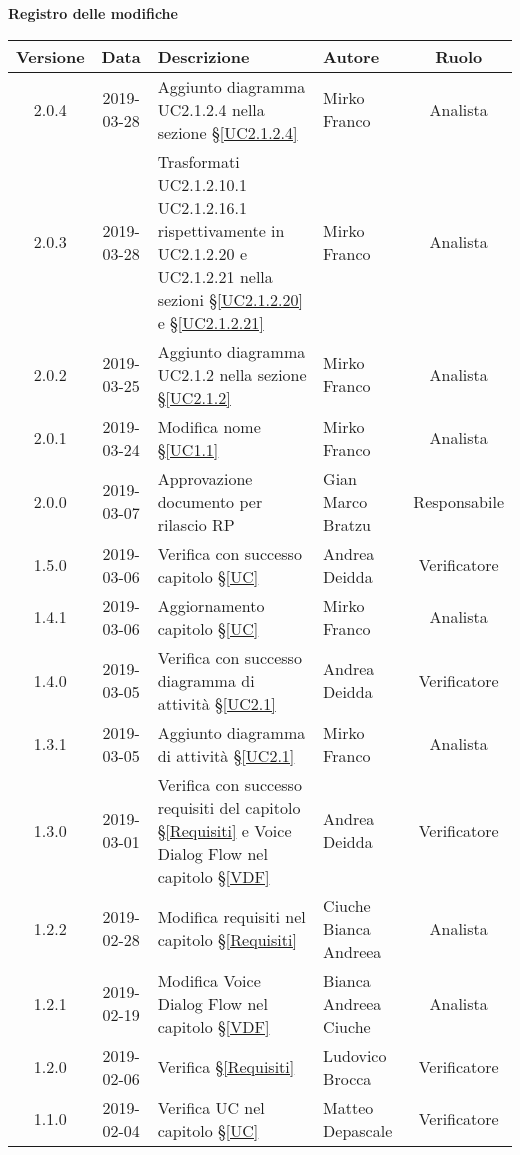 	\begin{center}
		\textbf{Registro delle modifiche}
	\end{center}
	\begin{center}
		\begin{tabularx}{\textwidth}{|c|c|X|X|c|}
			\hline
			\textbf{Versione} & \textbf{Data} & \textbf{Descrizione} & \textbf{Autore} & \textbf{Ruolo} \\
			\hline
			2.0.4 & 2019-03-28 & Aggiunto diagramma UC2.1.2.4 nella sezione \S\ref{UC2.1.2.4} & Mirko Franco & Analista \\
			\hline
			2.0.3 & 2019-03-28 & Trasformati UC2.1.2.10.1  UC2.1.2.16.1 rispettivamente in UC2.1.2.20 e UC2.1.2.21 nella sezioni \S\ref{UC2.1.2.20} e \S\ref{UC2.1.2.21}& Mirko Franco & Analista \\
			\hline
			2.0.2 & 2019-03-25 & Aggiunto diagramma UC2.1.2 nella sezione \S\ref{UC2.1.2} & Mirko Franco & Analista \\
			\hline
			2.0.1 & 2019-03-24 & Modifica nome \S\ref{UC1.1} & Mirko Franco & Analista \\
			\hline
			2.0.0 & 2019-03-07 & Approvazione documento per rilascio RP & Gian Marco Bratzu & Responsabile \\
			\hline
			1.5.0 & 2019-03-06 & Verifica con successo capitolo \S\ref{UC} &Andrea Deidda & Verificatore \\
			\hline
			1.4.1 & 2019-03-06 & Aggiornamento capitolo \S\ref{UC} & Mirko Franco & Analista \\
			\hline
			1.4.0 & 2019-03-05 & Verifica con successo diagramma di attività \S\ref{UC2.1} & Andrea Deidda & Verificatore \\
			\hline
			1.3.1 & 2019-03-05 & Aggiunto diagramma di attività \S\ref{UC2.1} & Mirko Franco & Analista \\
			\hline
			1.3.0 & 2019-03-01 & Verifica con successo requisiti del capitolo \S\ref{Requisiti} e Voice Dialog Flow nel capitolo \S\ref{VDF} & Andrea Deidda & Verificatore \\
			\hline
			1.2.2 & 2019-02-28 & Modifica requisiti nel capitolo \S\ref{Requisiti}& Ciuche Bianca Andreea & Analista \\
			\hline
			1.2.1 & 2019-02-19 & Modifica Voice Dialog Flow  nel capitolo \S\ref{VDF} & Bianca Andreea Ciuche & Analista  \\
			\hline
			1.2.0 & 2019-02-06 & Verifica \S\ref{Requisiti}& Ludovico Brocca & Verificatore \\
			\hline
			1.1.0 & 2019-02-04 & Verifica UC nel capitolo \S\ref{UC}& Matteo Depascale & Verificatore\\

\end{tabularx}
\end{center}
